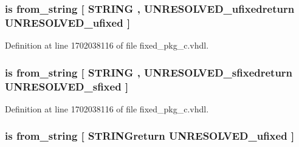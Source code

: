 \subsubsection[{from\+\_\+bstring}]{ {\bfseries \textcolor{keywordflow}{is}\textcolor{vhdlchar}{ }\textcolor{vhdlchar}{from\+\_\+string}\textcolor{vhdlchar}{ }\textcolor{vhdlchar}{\mbox{[}}\textcolor{vhdlchar}{ }\textcolor{comment}{S\+T\+R\+I\+N\+G}\textcolor{vhdlchar}{ }\textcolor{vhdlchar}{,}\textcolor{vhdlchar}{ }\textcolor{vhdlchar}{U\+N\+R\+E\+S\+O\+L\+V\+E\+D\+\_\+ufixedreturn}\textcolor{vhdlchar}{ }{\bfseries {\bf U\+N\+R\+E\+S\+O\+L\+V\+E\+D\+\_\+ufixed}} \textcolor{vhdlchar}{ }\textcolor{vhdlchar}{\mbox{]}}\textcolor{vhdlchar}{ }} \hspace{0.3cm}{\ttfamily [Alias]}}\label{classfixed__pkg_a75662d795197c31b5987068ea5454087}


Definition at line 1702038116 of file fixed\+\_\+pkg\+\_\+c.\+vhdl.

\hypertarget{classfixed__pkg_a6b28cd3c63eda48c2c2f1bb7fba726fc}{}
\subsubsection[{from\+\_\+bstring}]{ {\bfseries \textcolor{keywordflow}{is}\textcolor{vhdlchar}{ }\textcolor{vhdlchar}{from\+\_\+string}\textcolor{vhdlchar}{ }\textcolor{vhdlchar}{\mbox{[}}\textcolor{vhdlchar}{ }\textcolor{comment}{S\+T\+R\+I\+N\+G}\textcolor{vhdlchar}{ }\textcolor{vhdlchar}{,}\textcolor{vhdlchar}{ }\textcolor{vhdlchar}{U\+N\+R\+E\+S\+O\+L\+V\+E\+D\+\_\+sfixedreturn}\textcolor{vhdlchar}{ }{\bfseries {\bf U\+N\+R\+E\+S\+O\+L\+V\+E\+D\+\_\+sfixed}} \textcolor{vhdlchar}{ }\textcolor{vhdlchar}{\mbox{]}}\textcolor{vhdlchar}{ }} \hspace{0.3cm}{\ttfamily [Alias]}}\label{classfixed__pkg_a6b28cd3c63eda48c2c2f1bb7fba726fc}


Definition at line 1702038116 of file fixed\+\_\+pkg\+\_\+c.\+vhdl.

\hypertarget{classfixed__pkg_aef58272e8d4a4d71cf8e739793aaf721}{}
\subsubsection[{from\+\_\+bstring}]{ {\bfseries \textcolor{keywordflow}{is}\textcolor{vhdlchar}{ }\textcolor{vhdlchar}{from\+\_\+string}\textcolor{vhdlchar}{ }\textcolor{vhdlchar}{\mbox{[}}\textcolor{vhdlchar}{ }\textcolor{vhdlchar}{S\+T\+R\+I\+N\+Greturn}\textcolor{vhdlchar}{ }{\bfseries {\bf U\+N\+R\+E\+S\+O\+L\+V\+E\+D\+\_\+ufixed}} \textcolor{vhdlchar}{ }\textcolor{vhdlchar}{\mbox{]}}\textcolor{vhdlchar}{ }} \hspace{0.3cm}{\ttfamily [Alias]}}\label{classfixed__pkg_aef58272e8d4a4d71cf8e739793aaf721}


